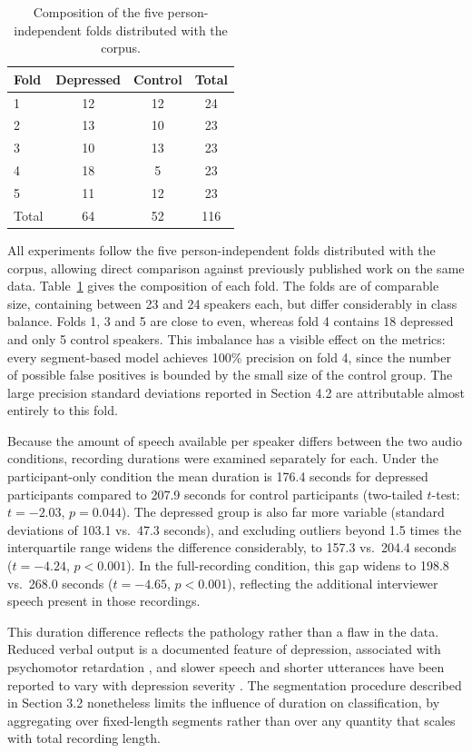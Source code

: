 \documentclass{mproj}
\begin{document}
\begin{table}[htbp]
  \centering
  \caption{Composition of the five person-independent folds distributed with
  the corpus.}
  \label{tab:folds}
  \begin{tabular}{lccc}
    \toprule
    Fold & Depressed & Control & Total \\
    \midrule
    1 & 12 & 12 & 24 \\
    2 & 13 & 10 & 23 \\
    3 & 10 & 13 & 23 \\
    4 & 18 &  5 & 23 \\
    5 & 11 & 12 & 23 \\
    \midrule
    Total & 64 & 52 & 116 \\
    \bottomrule
  \end{tabular}
\end{table}

All experiments follow the five person-independent folds distributed with the corpus, allowing direct comparison against previously published work on the same data. Table~\ref{tab:folds} gives the composition of each fold. The folds are of comparable size, containing between 23 and 24 speakers each, but differ considerably in class balance. Folds 1, 3 and 5 are close to even, whereas fold 4 contains 18 depressed and only 5 control speakers. This imbalance has a visible effect on the metrics: every segment-based model achieves 100\% precision on fold 4, since the number of possible false positives is bounded by the small size of the control group. The large precision standard deviations reported in Section 4.2 are attributable almost entirely to this fold.

Because the amount of speech available per speaker differs between the two audio conditions, recording durations were examined separately for each. Under the participant-only condition the mean duration is 176.4 seconds for depressed participants compared to 207.9 seconds for control participants (two-tailed $t$-test: $t = -2.03$, $p = 0.044$). The depressed group is also far more variable (standard deviations of 103.1 vs.\ 47.3 seconds), and excluding outliers beyond 1.5 times the interquartile range widens the difference considerably, to 157.3 vs.\ 204.4 seconds ($t = -4.24$, $p < 0.001$). In the full-recording condition, this gap widens to 198.8 vs.\ 268.0 seconds ($t = -4.65$, $p < 0.001$), reflecting the additional interviewer speech present in those recordings.

This duration difference reflects the pathology rather than a flaw in the data. Reduced verbal output is a documented feature of depression, associated with psychomotor retardation \cite{buyukdura2011}, and slower speech and shorter utterances have been reported to vary with depression severity \cite{mundt2012}. The segmentation procedure described in Section 3.2 nonetheless limits the influence of duration on classification, by aggregating over fixed-length segments rather than over any quantity that scales with total recording length.
\end{document}
